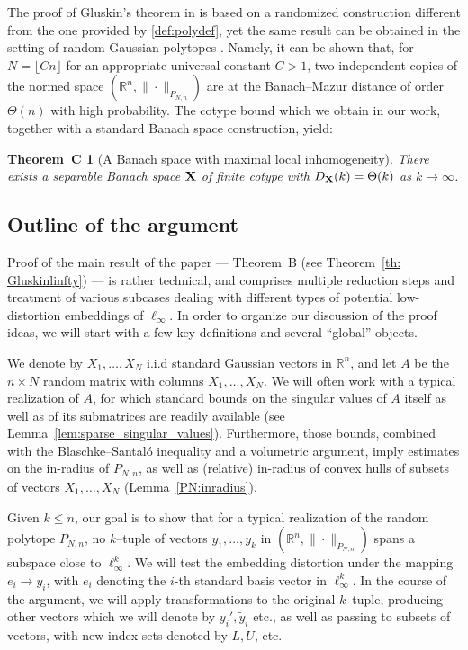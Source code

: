 \documentclass[11pt]{amsart}
\newtheorem*{theoremC*}{Theorem~C}
\theoremstyle{definition}
\theoremstyle{plain}
\newcommand{\R}{\mathbb{R}}
\def\R{{\mathbb R}}
\begin{document}
\smallskip

The proof of Gluskin's theorem in \cite{Gluskin} is based
on a randomized construction
different from the one provided by \eqref{def:polydef},
yet the same result can be obtained in the setting of random Gaussian
polytopes \cite{LGl}. Namely,
it can be shown that, for $N=\lfloor Cn\rfloor$
for an appropriate universal constant $C>1$,
two independent copies of the normed space
$(\R^n,\|\cdot\|_{P_{N,n}})$ are at the Banach--Mazur
distance of order $\Theta(n)$ with high probability.
The cotype bound which we obtain in our work,
together with a standard Banach space
construction, yield:
\begin{theoremC*}[A Banach space %
with maximal local inhomogeneity]
There exists a separable Banach space ${\bf X}$
of finite cotype with
$
D_{\bf X}(k)=\Theta(k)
$ as $k\to\infty$.
\end{theoremC*}




\subsection{Outline of the argument}

Proof of the main result of the paper --- Theorem~B (see Theorem~\ref{th: Gluskinlinfty})
--- is rather technical, and comprises multiple reduction steps
and treatment of various subcases dealing with different types of
potential low-distortion embeddings of $\ell_\infty$.
In order to organize our discussion of the proof ideas,
we will start with a few key definitions and several ``global'' objects.

We denote by $X_1,\dots,X_N$ i.i.d standard Gaussian vectors in $\R^n$,
and let $A$ be the $n\times N$ random matrix with columns $X_1,\dots,X_N$.
We will often work with a typical realization of $A$, for which standard
bounds on the singular values of $A$ itself as well as
of its submatrices are readily available (see Lemma~\ref{lem:sparse_singular_values}).
Furthermore, those bounds, combined with the Blaschke--Santal\'o inequality
and a volumetric argument, imply estimates on the in-radius
of $P_{N,n}$, as well as (relative) in-radius of convex hulls of subsets
of vectors $X_1,\dots,X_N$ (Lemma~\ref{PN:inradius}).

Given $k\leq n$, our goal
is to show that for a typical realization
of the random polytope $P_{N,n}$, no $k$--tuple of vectors $y_1,\dots,y_k$
in $(\R^n,\|\cdot\|_{P_{N,n}})$ spans a subspace close to $\ell_\infty^k$.
We will test the embedding distortion under the mapping $e_i\to y_i$,
with $e_i$ denoting the $i$-th standard basis vector in $\ell_\infty^k$.
In the course of the argument, we will apply transformations to the original
$k$--tuple, producing other vectors which we will denote by $y_i', \tilde y_i$ etc.,
as well as passing to subsets of vectors, with new index sets denoted by $L,U$, etc.
\end{document}

